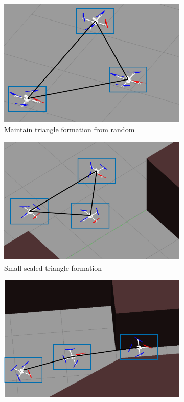 \begin{figure}[!]
    \centering
    \begin{subfigure}[b]{0.48\textwidth}
    \includegraphics[width=\textwidth]{paper2/images/gazebo_res1.pdf}
    \caption{Maintain triangle formation from random}
    \label{fig:1gazebo_1}
    \end{subfigure}
    \begin{subfigure}[b]{0.48\textwidth}
    \includegraphics[width=\textwidth]{paper2/images/gazebo_res2.pdf}
    \caption{Small-scaled triangle formation}
    \label{fig:1gazebo_2}
    \end{subfigure}
    \begin{subfigure}[b]{0.48\textwidth}
    \includegraphics[width=\textwidth]{paper2/images/gazebo_res3.pdf}

\end{subfigure}
\end{figure}
